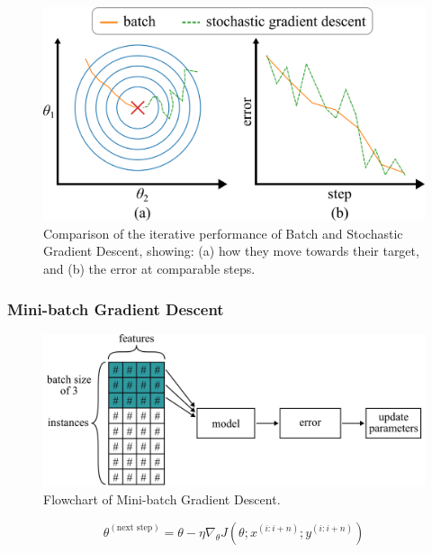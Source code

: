 \documentclass[12pt,letter]{article}
\begin{document}
\begin{figure}[H]
	\centering
	\includegraphics[]{../figures/stochastic_gradient_descent_target}
	\caption{Comparison of the iterative performance of Batch and Stochastic Gradient Descent, showing: (a) how they move towards their target, and (b) the error at comparable steps.}
	\label{fig:stochastic_gradient_descent_target}
\end{figure}



\pagebreak


\subsubsection{Mini-batch Gradient Descent}


\begin{figure}[H]
	\centering
	\includegraphics[width=5.4in]{../figures/gradient_descent_mini_batch}
	\caption{Flowchart of Mini-batch Gradient Descent.}
	\label{fig:gradient_descent_mini_batch}
\end{figure}


\begin{equation}
\theta^{(\text{next step})} = \theta - \eta \nabla_\theta J(\theta; x^{(i:i+n)}; y^{(i:i+n)})
\end{equation}
\end{document}
